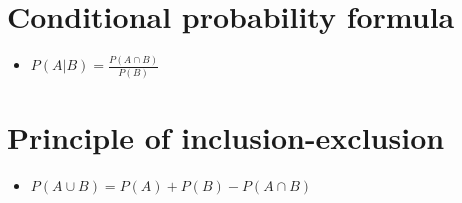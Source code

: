 \section{Conditional probability formula}
\begin{itemize}
    \item $P(A|B) = \frac{P(A \cap B)}{P(B)}$
\end{itemize}
\section{Principle of inclusion-exclusion}
\begin{itemize}
    \item $P(A\cup B)=P(A)+P(B)-P(A\cap B)$
\end{itemize}
